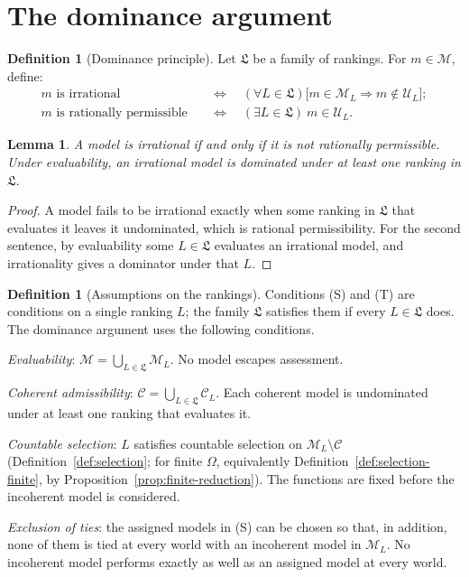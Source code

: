 \documentclass[11pt]{article}
\newtheorem{lemma}[theorem]{Lemma}
\theoremstyle{definition}
\newtheorem{definition}[theorem]{Definition}
\theoremstyle{remark}
\newcommand{\M}{\mathcal M}
\newcommand{\C}{\mathcal C}
\newcommand{\U}{\mathcal U}
\newcommand{\Lf}{\mathfrak L}
\begin{document}
\section{The dominance argument}\label{sec:conclusion}

\begin{definition}[Dominance principle]\label{def:permissibility}
Let $\Lf$ be a family of rankings. For $m\in\M$, define:
\begin{align*}
m\text{ is irrational}&\quad\Longleftrightarrow\quad (\forall L\in\Lf)\bigl[m\in\M_L\Rightarrow m\notin\U_L\bigr];\\
m\text{ is rationally permissible}&\quad\Longleftrightarrow\quad (\exists L\in\Lf)\ m\in\U_L.
\end{align*}
\end{definition}

\begin{lemma}\label{lem:complement}
A model is irrational if and only if it is not rationally permissible. Under evaluability, an irrational model is dominated under at least one ranking in $\Lf$.
\end{lemma}
\begin{proof}
A model fails to be irrational exactly when some ranking in $\Lf$ that evaluates it leaves it undominated, which is rational permissibility. For the second sentence, by evaluability some $L\in\Lf$ evaluates an irrational model, and irrationality gives a dominator under that $L$.
\end{proof}

\begin{definition}[Assumptions on the rankings]\label{def:argument-assumptions}
{\color{red}Conditions (S) and (T)} are conditions on a single ranking $L$; the family $\Lf$ satisfies them if every $L\in\Lf$ does. The dominance argument uses the following conditions.
\begin{itemize}[leftmargin=3.4em,labelsep=0.5em]
\item[\textbf{(E)}] \emph{Evaluability}: $\M=\bigcup_{L\in\Lf}\M_L$. No model escapes assessment.
\item[\textbf{(A)}] \emph{Coherent admissibility}: $\C=\bigcup_{L\in\Lf}\C_L$. Each coherent model is undominated under at least one ranking that evaluates it.
\item[\textbf{{\color{red}(S)}}] \emph{Countable selection}: $L$ satisfies countable selection on $\M_L\setminus\C$ (Definition~\ref{def:selection}{\color{red}; for finite $\Omega$, equivalently Definition~\ref{def:selection-finite}, by Proposition~\ref{prop:finite-reduction}}). The functions are fixed before the incoherent model is considered.
{\color{red}\item[\textbf{(T)}] \emph{Exclusion of ties}: the assigned models in (S) can be chosen so that, in addition, none of them is tied at every world with an incoherent model in $\M_L$. No incoherent model performs exactly as well as an assigned model at every world.}
\end{itemize}
\end{definition}
\end{document}

